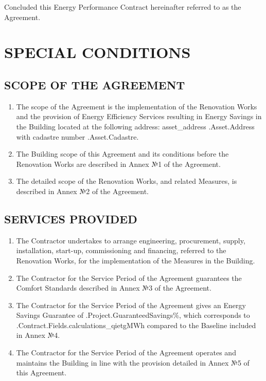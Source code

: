 Concluded this Energy Performance Contract hereinafter referred to as the Agreement.

\section{SPECIAL CONDITIONS}
\subsection{SCOPE OF THE AGREEMENT}
\begin{enumerate}
	\item	The scope of the Agreement is the implementation of the Renovation Works and the provision of Energy Efficiency Services resulting in Energy Savings in the Building located at the following address: {{asset_address .Asset.Address}} with cadastre number {{.Asset.Cadastre}}.
	\item	The Building scope of this Agreement and its conditions before the Renovation Works are described in Annex №1 of the Agreement.
	\item	The detailed scope of the Renovation Works, and related Measures, is described in Annex №2 of the Agreement.
\end{enumerate}

\subsection{SERVICES PROVIDED}
\begin{enumerate}
	\item	The Contractor undertakes to arrange engineering, procurement, supply, installation, start-up, commissioning and financing, referred to the Renovation Works, for the implementation of the Measures in the Building.
	\item	The Contractor for the Service Period of the Agreement guarantees the Comfort Standards described in Annex №3 of the Agreement.
  \item	The Contractor for the Service Period of the Agreement gives an Energy Savings Guarantee of {{.Project.GuaranteedSavings}}\%, which corresponds to {{.Contract.Fields.calculations_qietg}}MWh compared to the Baseline included in Annex №4.
	\item	The Contractor for the Service Period of the Agreement operates and maintains the Building in line with the provision detailed in Annex №5 of this Agreement.
\end{enumerate}

